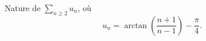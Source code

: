 \begin{enonce}
\begin{exercise}[ID={RMS133 E1369},subtitle={IMT PSI 2022},tags={},difficulty={}]
  Nature de $\sum_{n\geq 2} u_n$, où
  \begin{equation*}
    u_n = \arctan\left( \frac{n+1}{n-1} \right) - \frac{\pi}{4}.
  \end{equation*}
\end{exercise}
\begin{solution}
\end{solution}
\end{enonce}
